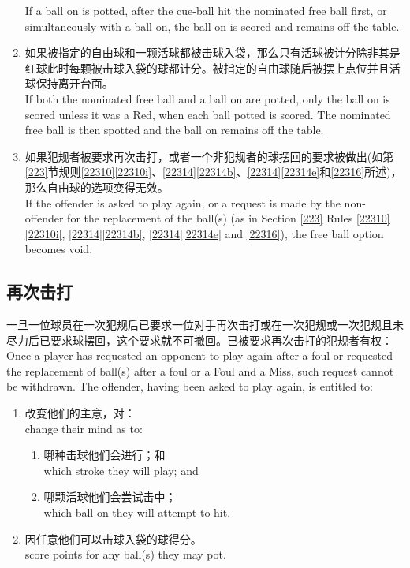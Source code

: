 \begin{enumerate}[label=(\alph*)]
    If a ball on is potted, after the cue-ball hit the nominated free ball first, or simultaneously with a ball on, the ball on is scored and remains off the table.
    \item 如果被指定的自由球和一颗活球都被击球入袋，那么只有活球被计分除非其是红球此时每颗被击球入袋的球都计分。被指定的自由球随后被摆上点位并且活球保持离开台面。\\
    If both the nominated free ball and a ball on are potted, only the ball on is scored unless it was a Red, when each ball potted is scored. The nominated free ball is then spotted and the ball on remains off the table.
    \item 如果犯规者被要求再次击打，或者一个非犯规者的球摆回的要求被做出(如第\ref{223}节规则\ref{22310}\ref{22310i}、\ref{22314}\ref{22314b}、\ref{22314}\ref{22314e}和\ref{22316}所述)，那么自由球的选项变得无效。\\
    If the offender is asked to play again, or a request is made by the non-offender for the replacement of the ball(s) (as in Section \ref{223} Rules \ref{22310}\ref{22310i}, \ref{22314}\ref{22314b}, \ref{22314}\ref{22314e} and \ref{22316}), the free ball option becomes void.
\end{enumerate}

\subsection{再次击打}

\noindent 一旦一位球员在一次犯规后已要求一位对手再次击打或在一次犯规或一次犯规且未尽力后已要求球摆回，这个要求就不可撤回。已被要求再次击打的犯规者有权：\\
Once a player has requested an opponent to play again after a foul or requested the replacement of ball(s) after a foul or a Foul and a Miss, such request cannot be withdrawn. The offender, having been asked to play again, is entitled to:
\begin{enumerate}[label=(\alph*)]
    \item 改变他们的主意，对：\\
    change their mind as to:
    \begin{enumerate}[label=(\roman*)]
        \item 哪种击球他们会进行；和\\
        which stroke they will play; and
        \item 哪颗活球他们会尝试击中；\\
        which ball on they will attempt to hit.
    \end{enumerate}
    \item 因任意他们可以击球入袋的球得分。\\
    score points for any ball(s) they may pot.
\end{enumerate}

